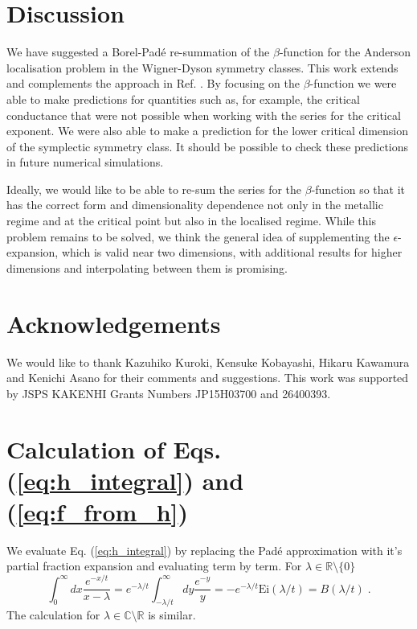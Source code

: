 \documentclass[singlecolumn]{jpsj3}
\begin{document}
\section{Discussion}\label{sec:discussion}

We have suggested a Borel-Pad\'e re-summation of the $\beta$-function for the Anderson localisation
problem in the Wigner-Dyson symmetry classes.
This work extends and complements the approach in Ref. .
By focusing on the $\beta$-function we were able to make predictions for quantities such as, for example, the critical conductance that were not possible when working with the series for the critical exponent.
We were also able to make a prediction for the lower critical dimension of the symplectic symmetry class.
It should be possible to check these predictions in future numerical simulations.

Ideally, we would like to be able to re-sum the series for the $\beta$-function so that it has the correct form and dimensionality dependence not only in the metallic regime and at the critical point but also in the localised regime.
While this problem remains to be solved, we think the general idea of supplementing the $\epsilon$-expansion, which is valid near two dimensions, with additional results for higher dimensions and interpolating between them is promising.

\section*{Acknowledgements}
We would like to thank Kazuhiko Kuroki, Kensuke Kobayashi, Hikaru Kawamura and Kenichi Asano for their comments and suggestions.
This work was supported by JSPS KAKENHI Grants Numbers JP15H03700 and 26400393.



\appendix




\section{Calculation of Eqs. (\ref{eq:h_integral}) and (\ref{eq:f_from_h})}\label{sec:details}

We evaluate Eq. (\ref{eq:h_integral}) by replacing the Pad\'{e} approximation with it's partial fraction expansion and evaluating term by term.
For $\lambda \in \mathbb{R} \setminus \{0\}$
\begin{equation}
  \int_{0}^{\infty} dx \frac{e^{-x/t}}{x-\lambda} =
  e^{-\lambda/t}  \int_{-\lambda/t}^{\infty} dy \frac{e^{-y}}{y} =
  - e^{-\lambda/t} \mathrm{Ei}(\lambda/t) = B \left( \lambda/t \right)\;.
\end{equation}
The calculation for $\lambda \in \mathbb{C} \setminus \mathbb{R}$ is similar.
\end{document}
